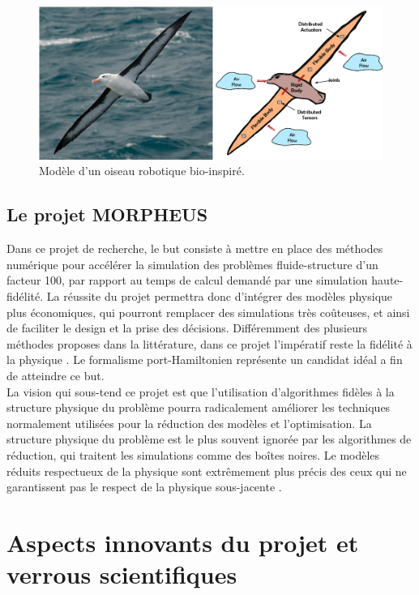 \documentclass[french]{article}
\begin{document}
\begin{figure}[tb]
	\centering
	\includegraphics[width = .7\textwidth]{Bird_Port_Hamiltonian_Subsystems_FULL_ARC.eps}
	\caption{Modèle d'un oiseau robotique bio-inspiré.}
	\label{fig:pH_view_bird}
\end{figure}

\subsection{Le projet MORPHEUS}
Dans ce projet de recherche, le but consiste \`a mettre en place des méthodes numérique pour accélérer la simulation des problèmes fluide-structure d'un facteur 100, par rapport au temps de calcul demandé par une simulation haute-fidélité.  La réussite du projet permettra donc d'intégrer des modèles physique plus économiques, qui pourront remplacer des simulations très co\^{u}teuses, et ainsi de faciliter le design et la prise des décisions. Différemment des plusieurs méthodes proposes dans la littérature, dans ce projet l'impératif reste la fidélité \`a la physique \cite{willcox2021}. Le formalisme port-Hamiltonien représente un candidat idéal a fin de atteindre ce but. \\

La vision qui sous-tend ce projet est que l'utilisation d'algorithmes fidèles \`a la structure physique du problème pourra radicalement améliorer les techniques normalement utilisées pour la réduction des modèles et l'optimisation. La structure physique du problème est le plus souvent ignorée par les algorithmes de réduction, qui traitent les simulations comme des bo\^{i}tes noires. Le modèles réduits respectueux de la physique sont extrêmement plus précis des ceux qui ne garantissent pas le respect de la physique sous-jacente \cite{lee2020}. 


\section{Aspects innovants du projet et verrous scientifiques}
\end{document}
